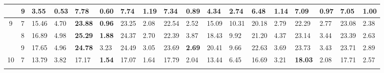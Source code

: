 \documentclass[conference]{IEEEtran}
\begin{document}
\begin{table}[]
\begin{tabular}{|cl|ll|ll|ll|ll|ll|ll|ll|ll|}
		\multicolumn{1}{|c|}{}                    & 9          & \multicolumn{1}{l|}{3.55}          & \textbf{0.53} & \multicolumn{1}{l|}{\textbf{7.78}}  & 0.60          & \multicolumn{1}{l|}{7.74}           & 1.19          & \multicolumn{1}{l|}{7.34}           & 0.89          & \multicolumn{1}{l|}{4.34}                 & 2.74  & \multicolumn{1}{l|}{6.48}  & 1.14 & \multicolumn{1}{l|}{7.09}           & 0.97          & \multicolumn{1}{l|}{7.05}           & 1.00          \\ \hline
		\multicolumn{1}{|c|}{\multirow{3}{*}{9}}  & 7          & \multicolumn{1}{l|}{15.46}         & 4.70          & \multicolumn{1}{l|}{\textbf{23.88}} & \textbf{0.96} & \multicolumn{1}{l|}{23.25}          & 2.08          & \multicolumn{1}{l|}{22.54}          & 2.52          & \multicolumn{1}{l|}{15.09}                & 10.31 & \multicolumn{1}{l|}{20.18} & 2.79 & \multicolumn{1}{l|}{22.29}          & 2.77          & \multicolumn{1}{l|}{23.08}          & 2.38          \\ \cline{2-18} 
		\multicolumn{1}{|c|}{}                    & 8          & \multicolumn{1}{l|}{16.89}         & 4.98          & \multicolumn{1}{l|}{\textbf{25.29}} & \textbf{1.88} & \multicolumn{1}{l|}{24.37}          & 2.70          & \multicolumn{1}{l|}{22.39}          & 3.87          & \multicolumn{1}{l|}{18.43}                & 9.92  & \multicolumn{1}{l|}{21.20} & 4.37 & \multicolumn{1}{l|}{23.14}          & 3.44          & \multicolumn{1}{l|}{23.39}          & 2.63          \\ \cline{2-18} 
		\multicolumn{1}{|c|}{}                    & 9          & \multicolumn{1}{l|}{17.65}         & 4.96          & \multicolumn{1}{l|}{\textbf{24.78}} & 3.23          & \multicolumn{1}{l|}{24.49}          & 3.05          & \multicolumn{1}{l|}{23.69}          & \textbf{2.69} & \multicolumn{1}{l|}{20.41}                & 9.66  & \multicolumn{1}{l|}{22.63} & 3.69 & \multicolumn{1}{l|}{23.73}          & 3.43          & \multicolumn{1}{l|}{23.71}          & 2.89          \\ \hline
		\multicolumn{1}{|c|}{\multirow{3}{*}{10}} & 7          & \multicolumn{1}{l|}{13.79}         & 3.82          & \multicolumn{1}{l|}{17.17}          & \textbf{1.54} & \multicolumn{1}{l|}{17.07}          & 1.64          & \multicolumn{1}{l|}{17.79}          & 2.04          & \multicolumn{1}{l|}{13.44}                & 6.45  & \multicolumn{1}{l|}{16.69} & 3.21 & \multicolumn{1}{l|}{\textbf{18.03}} & 2.08          & \multicolumn{1}{l|}{17.71}          & 2.57          \\ \cline{2-18} 

\end{tabular}
\end{table}
\end{document}
